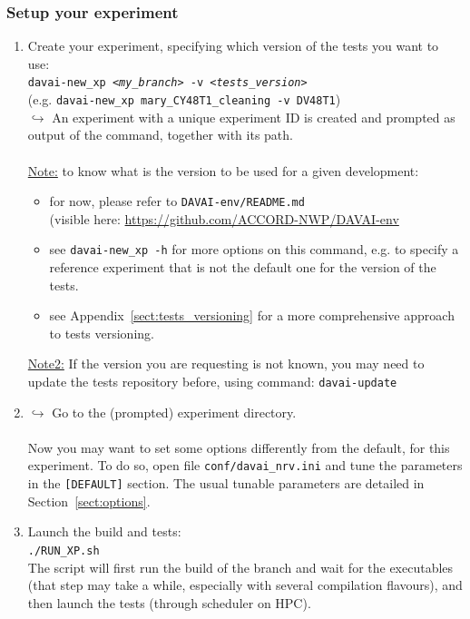 \documentclass[a4paper,10pt,twoside]{article}
\begin{document}
\subsubsection{Setup your experiment}
\begin{enumerate}[label=(\alph*)]
 \item Create your experiment, specifying which version of the tests you want to use:\\
 \texttt{davai-new\_xp \textit{<my\_branch>} -v \textit{<tests\_version>}}\\
 (e.g. \texttt{davai-new\_xp mary\_CY48T1\_cleaning -v DV48T1})\\
 $\hookrightarrow$ An experiment with a unique experiment ID is created and prompted as output of the command, together with its path.\\
 \\
 \underline{Note:} to know what is the version to be used for a given development:
 \begin{itemize}
  \item for now, please refer to \texttt{DAVAI-env/README.md}\\
        (visible here: \href{https://github.com/ACCORD-NWP/DAVAI-env}{https://github.com/ACCORD-NWP/DAVAI-env}
  \item see \texttt{davai-new\_xp -h} for more options on this command, e.g. to specify a reference experiment that is not the default one for the version of the tests.
  \item see Appendix~\ref{sect:tests_versioning} for a more comprehensive approach to tests versioning.
 \end{itemize}
 \underline{Note2:} If the version you are requesting is not known, you may need to update the tests repository before, using command: \texttt{davai-update}
 \item $\hookrightarrow$ Go to the (prompted) experiment directory.\\
 \\
 Now you may want to set some options differently from the default, for this experiment. To do so, open file \texttt{conf/davai\_nrv.ini} and tune the parameters in the \texttt{[DEFAULT]} section. The usual tunable parameters are detailed in Section~\ref{sect:options}.
 \item Launch the build and tests:\\
 \texttt{./RUN\_XP.sh}\\
 The script will first run the build of the branch and wait for the executables (that step may take a while, especially with several compilation flavours), and then launch the tests (through scheduler on HPC).
\end{enumerate}
\end{document}
